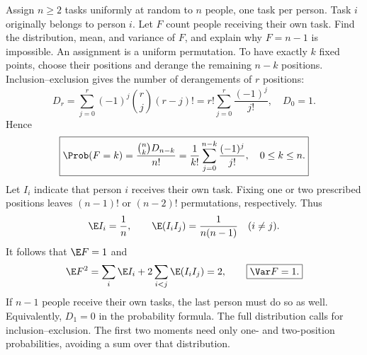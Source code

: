 Assign $n\ge2$ tasks uniformly at random to $n$ people, one task per person. Task $i$ originally belongs to person $i$. Let $F$ count people receiving their own task. Find the distribution, mean, and variance of $F$, and explain why $F=n-1$ is impossible.
\solution An assignment is a uniform permutation. To have exactly $k$ fixed points, choose their positions and derange the remaining $n-k$ positions. Inclusion--exclusion gives the number of derangements of $r$ positions:
\[
D_r=\sum_{j=0}^r(-1)^j\binom rj(r-j)!
=r!\sum_{j=0}^r\frac{(-1)^j}{j!},\quad D_0=1.
\]
Hence
\[
\boxed{\Prob(F=k)=\frac{\binom nkD_{n-k}}{n!}
=\frac1{k!}\sum_{j=0}^{n-k}\frac{(-1)^j}{j!},
\quad0\le k\le n.}
\]
Let $I_i$ indicate that person $i$ receives their own task. Fixing one or two prescribed positions leaves $(n-1)!$ or $(n-2)!$ permutations, respectively. Thus
\[
\E I_i=\frac1n,\qquad \E(I_iI_j)=\frac1{n(n-1)}\quad(i\ne j).
\]
It follows that $\E F=1$ and
\[
\E F^2=\sum_i\E I_i+2\sum_{i<j}\E(I_iI_j)=2,
\qquad \boxed{\Var F=1.}
\]
If $n-1$ people receive their own tasks, the last person must do so as well. Equivalently, $D_1=0$ in the probability formula.
\insight The full distribution calls for inclusion--exclusion. The first two moments need only one- and two-position probabilities, avoiding a sum over that distribution.
